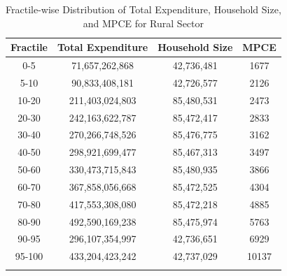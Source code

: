 \documentclass{article}
\begin{document}
	
	\begin{longtable}{|c|c|c|c|}
		\hline
		\textbf{Fractile} & \textbf{Total Expenditure} & \textbf{Household Size} & \textbf{MPCE} \\ \hline
		\endhead
		
		0-5     & 71,657,262,868   & 42,736,481   & 1677 \\ \hline
		5-10    & 90,833,408,181   & 42,726,577   & 2126 \\ \hline
		10-20   & 211,403,024,803  & 85,480,531   & 2473 \\ \hline
		20-30   & 242,163,622,787  & 85,472,417   & 2833 \\ \hline
		30-40   & 270,266,748,526  & 85,476,775   & 3162 \\ \hline
		40-50   & 298,921,699,477  & 85,467,313   & 3497 \\ \hline
		50-60   & 330,473,715,843  & 85,480,935   & 3866 \\ \hline
		60-70   & 367,858,056,668  & 85,472,525   & 4304 \\ \hline
		70-80   & 417,553,308,080  & 85,472,218   & 4885 \\ \hline
		80-90   & 492,590,169,238  & 85,475,974   & 5763 \\ \hline
		90-95   & 296,107,354,997  & 42,736,651   & 6929 \\ \hline
		95-100  & 433,204,423,242  & 42,737,029   & 10137 \\ \hline
		
		\caption{Fractile-wise Distribution of Total Expenditure, Household Size, and MPCE for Rural Sector}
		\label{table:fractile_rural}
	\end{longtable}
	
\end{document}
